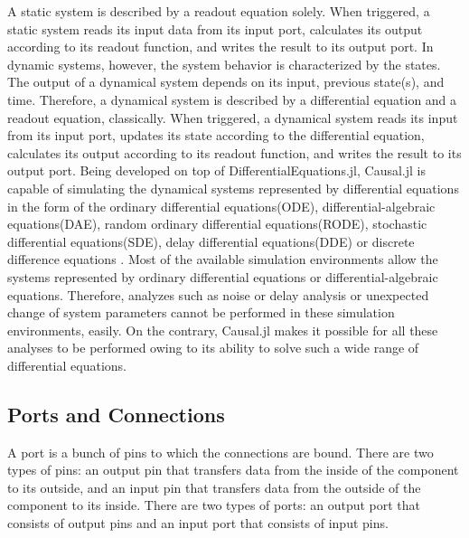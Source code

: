 A static system is described by a readout equation solely. When triggered, a static system reads its input data from its input port, calculates its output according to its readout function, and writes the result to its output port. In dynamic systems, however, the system behavior is characterized by the states. The output of a dynamical system depends on its input, previous state(s), and time. Therefore, a dynamical system is described by a differential equation and a readout equation, classically. When triggered, a dynamical system reads its input from its input port, updates its state according to the differential equation, calculates its output according to its readout function, and writes the result to its output port. Being developed on top of DifferentialEquations.jl, Causal.jl is capable of simulating the dynamical systems represented by differential equations in the form of the ordinary differential equations(ODE), differential-algebraic equations(DAE), random ordinary differential equations(RODE), stochastic differential equations(SDE), delay differential equations(DDE) or discrete difference equations \cite{rackauckas2017differentialequations}. Most of the available simulation environments allow the systems represented by ordinary differential equations or differential-algebraic equations\cite{elmqvist1978structured,nytsch2006advanced,zimmer2008introducing,mosterman2002hybrsim,van2001variables,giorgidze2009higher,pfeiffer2012pysimulator,simulink}. Therefore, analyzes such as noise or delay analysis or unexpected change of system parameters cannot be performed in these simulation environments, easily. On the contrary, Causal.jl makes it possible for all these analyses to be performed owing to its ability to solve such a wide range of differential equations.

\subsection{Ports and Connections}
A port is a bunch of pins to which the connections are bound. There are two types of pins: an output pin that transfers data from the inside of the component to its outside, and an input pin that transfers data from the outside of the component to its inside. There are two types of ports: an output port that consists of output pins and an input port that consists of input pins.

